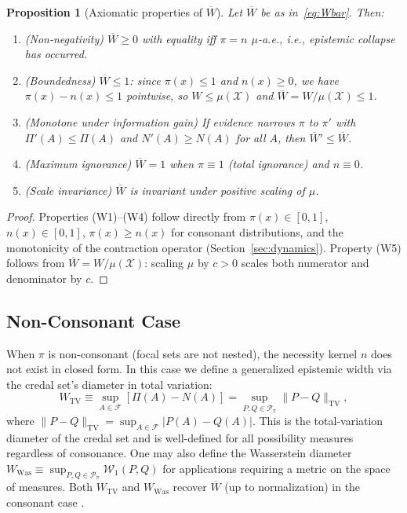 \documentclass[12pt]{article}
\newtheorem{proposition}[theorem]{Proposition}
\newcommand{\Ppi}{\mathcal{P}_\pi}
\newcommand{\calF}{\mathcal{F}}
\newcommand{\calX}{\mathcal{X}}
\begin{document}
\begin{proposition}[Axiomatic properties of $\overline{W}$]
\label{prop:W_axioms}
Let $\overline{W}$ be as in~\eqref{eq:Wbar}.
Then:
\begin{enumerate}[label=\textup{(W\arabic*)},ref=W\arabic*]
\item \textup{(Non-negativity)} $\overline{W}\ge 0$ with equality iff $\pi=n$ $\mu$-a.e.,
  i.e., epistemic collapse has occurred.
\item \textup{(Boundedness)} $\overline{W}\le 1$: since $\pi(x)\le 1$ and $n(x)\ge 0$,
  we have $\pi(x)-n(x)\le 1$ pointwise, so $W\le\mu(\calX)$ and $\overline{W}=W/\mu(\calX)\le 1$.
\item \textup{(Monotone under information gain)} If evidence narrows $\pi$ to $\pi'$
  with $\Pi'(A)\le\Pi(A)$ and $N'(A)\ge N(A)$ for all $A$, then $\overline{W}'\le\overline{W}$.
\item \textup{(Maximum ignorance)} $\overline{W}=1$ when $\pi\equiv 1$ (total ignorance)
  and $n\equiv 0$.
\item \textup{(Scale invariance)} $\overline{W}$ is invariant under positive scaling of $\mu$.
\end{enumerate}
\end{proposition}

\begin{proof}
Properties (W1)--(W4) follow directly from $\pi(x)\in[0,1]$, $n(x)\in[0,1]$,
$\pi(x)\ge n(x)$ for consonant distributions, and the monotonicity of the
contraction operator (Section~\ref{sec:dynamics}).
Property (W5) follows from $\overline{W}=W/\mu(\calX)$: scaling $\mu$ by $c>0$
scales both numerator and denominator by $c$.
\end{proof}

\subsection{Non-Consonant Case}
\label{sec:width_nonconsonant}

When $\pi$ is non-consonant (focal sets are not nested), the necessity kernel
$n$ does not exist in closed form.
In this case we define a generalized epistemic width via the credal set's
diameter in total variation:
\begin{equation}
W_{\mathrm{TV}} \equiv \sup_{A\in\calF}[\Pi(A)-N(A)]
= \sup_{P,Q\in\Ppi}\|P-Q\|_{\mathrm{TV}},
\label{eq:W_TV}
\end{equation}
where $\|P-Q\|_{\mathrm{TV}} = \sup_{A\in\calF}|P(A)-Q(A)|$.
This is the total-variation diameter of the credal set and is well-defined
for all possibility measures regardless of consonance.
One may also define the Wasserstein diameter
$W_{\mathrm{Was}} \equiv \sup_{P,Q\in\Ppi}\mathcal{W}_1(P,Q)$
for applications requiring a metric on the space of measures.
Both $W_{\mathrm{TV}}$ and $W_{\mathrm{Was}}$ recover $\overline{W}$ (up to
normalization) in the consonant case \cite{walley1991}.
\end{document}
